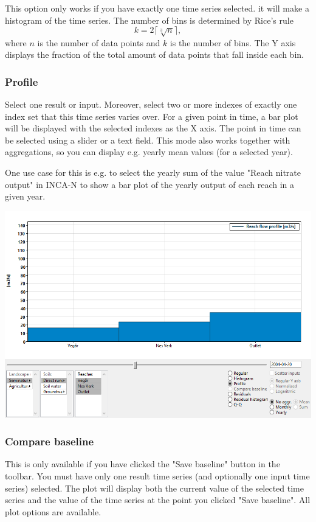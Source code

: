 \documentclass[11pt]{article}
\theoremstyle{definition}
\begin{document}
This option only works if you have exactly one time series selected. it will make a histogram of the time series. The number of bins is determined by %
Rice's rule %
\[
k = 2\lceil\sqrt[3]{n}\rceil,
\]
where $n$ is the number of data points and $k$ is the number of bins. The Y axis displays the fraction of the total amount of data points that fall inside each bin.

\subsubsection{Profile}

Select one result or input. Moreover, select two or more indexes of exactly one index set that this time series varies over. For a given point in time, a bar plot will be displayed with the selected indexes as the X axis. The point in time can be selected using a slider or a text field. This mode also works together with aggregations, so you can display e.g. yearly mean values (for a selected year).

One use case for this is e.g. to select the yearly sum of the value "Reach nitrate output" in INCA-N to show a bar plot of the yearly output of each reach in a given year.

\begin{center}
\includegraphics[width=0.7\linewidth]{img/scr2}
\end{center}

\subsubsection{Compare baseline}

This is only available if you have clicked the "Save baseline" button in the toolbar. You must have only one result time series (and optionally one input time series) selected. The plot will display both the current value of the selected time series and the value of the time series at the point you clicked "Save baseline". All plot options are available.
\end{document}
